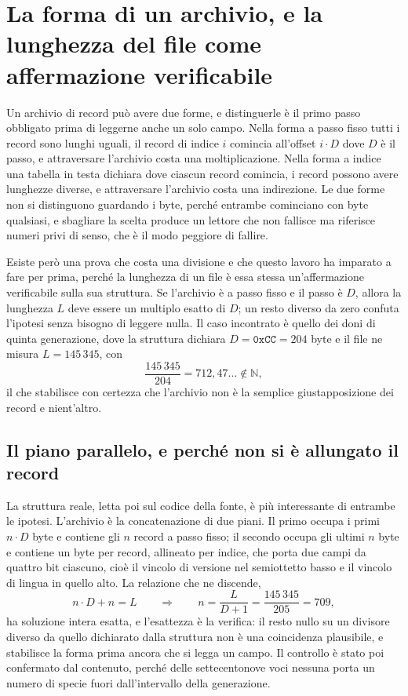 \section{La forma di un archivio, e la lunghezza del file come affermazione verificabile}
\label{sec:forma-archivio}

Un archivio di record può avere due forme, e distinguerle è il primo passo obbligato prima di leggerne anche un solo campo. Nella forma a passo fisso tutti i record sono lunghi uguali, il record di indice $i$ comincia all'offset $i \cdot D$ dove $D$ è il passo, e attraversare l'archivio costa una moltiplicazione. Nella forma a indice una tabella in testa dichiara dove ciascun record comincia, i record possono avere lunghezze diverse, e attraversare l'archivio costa una indirezione. Le due forme non si distinguono guardando i byte, perché entrambe cominciano con byte qualsiasi, e sbagliare la scelta produce un lettore che non fallisce ma riferisce numeri privi di senso, che è il modo peggiore di fallire.

Esiste però una prova che costa una divisione e che questo lavoro ha imparato a fare per prima, perché la lunghezza di un file è essa stessa un'affermazione verificabile sulla sua struttura. Se l'archivio è a passo fisso e il passo è $D$, allora la lunghezza $L$ deve essere un multiplo esatto di $D$; un resto diverso da zero confuta l'ipotesi senza bisogno di leggere nulla. Il caso incontrato è quello dei doni di quinta generazione, dove la struttura dichiara $D = \mathtt{0xCC} = 204$ byte e il file ne misura $L = 145\,345$, con
\[
\frac{145\,345}{204} = 712{,}47\ldots \notin \mathbb{N},
\]
il che stabilisce con certezza che l'archivio non è la semplice giustapposizione dei record e nient'altro.

\subsection{Il piano parallelo, e perché non si è allungato il record}

La struttura reale, letta poi sul codice della fonte, è più interessante di entrambe le ipotesi. L'archivio è la concatenazione di due piani. Il primo occupa i primi $n \cdot D$ byte e contiene gli $n$ record a passo fisso; il secondo occupa gli ultimi $n$ byte e contiene un byte per record, allineato per indice, che porta due campi da quattro bit ciascuno, cioè il vincolo di versione nel semiottetto basso e il vincolo di lingua in quello alto. La relazione che ne discende,
\[
n \cdot D + n = L \qquad \Longrightarrow \qquad n = \frac{L}{D+1} = \frac{145\,345}{205} = 709,
\]
ha soluzione intera esatta, e l'esattezza è la verifica: il resto nullo su un divisore diverso da quello dichiarato dalla struttura non è una coincidenza plausibile, e stabilisce la forma prima ancora che si legga un campo. Il controllo è stato poi confermato dal contenuto, perché delle settecentonove voci nessuna porta un numero di specie fuori dall'intervallo della generazione.

